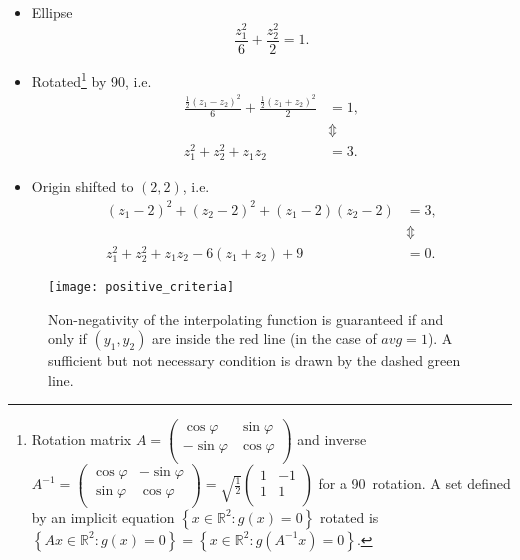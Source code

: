 \documentclass[11pt]{article}
\newcommand{\R}{\mathbb{R}}
\providecommand{\set}[1]{\left\{ #1 \right\}}
\newcommand{\avg}{\textit{avg}}
\providecommand{\set}[1]{\left\{ #1 \right\}}
\theoremstyle{break}            %
\begin{document}
\begin{itemize}
\item Ellipse
 \begin{equation*}
    \frac{z_1^2}{6}+\frac{z_2^2}{2} = 1.
 \end{equation*}
\item Rotated\footnote{Rotation matrix
        $A=\left(\begin{matrix}
            \cos\varphi & \sin\varphi\\
            -\sin\varphi &\cos\varphi\\
        \end{matrix}\right)$
        and inverse 
        $A^{-1}=\left(\begin{matrix}
            \cos\varphi & -\sin\varphi\\
            \sin\varphi &\cos\varphi\\
        \end{matrix}\right)
        = \sqrt{\frac{1}{2}}
        \left(\begin{matrix}
            1 & -1 \\
            1 & 1 \\
        \end{matrix}\right)$
        for a 90\textdegree\ rotation. A set defined by an
        implicit equation
        $\set{x\in\R^2:g(x)=0}$ rotated is
        $\set{Ax\in\R^2:g(x)=0}=\set{x\in\R^2:g(A^{-1}x)=0}$.
    }
    by 90\textdegree, i.e.
 \begin{equation*}
 \begin{split}
     \frac{\frac{1}{2}(z_1-z_2)^2}{6}+\frac{\frac{1}{2}(z_1+z_2)^2}{2} & = 1,\\
            & \Updownarrow\\
     z_1^2 + z_2^2 + z_1 z_2 & = 3.
 \end{split}
 \end{equation*}
\item Origin shifted to $(2,2)$, i.e. 
 \begin{equation*}
 \begin{split}
     (z_1-2)^2 + (z_2-2)^2 + (z_1-2) (z_2-2) & = 3,\\
             & \Updownarrow\\
     z_1^2 + z_2^2 + z_1 z_2 - 6(z_1+z_2) + 9 & = 0.
 \end{split}
 \end{equation*}
\end{itemize}

\begin{figure}
  \centering
  \texttt{[image: positive\_criteria]}
  \caption{Non-negativity of the interpolating function is guaranteed
        if and only if $(y_1,y_2)$ are inside the red line
        (in the case of $\avg=1$). A sufficient but not necessary
        condition is drawn by the dashed green line.}
  \label{fig:positive_criteria}
\end{figure}

\nocite{*}


\end{document}
